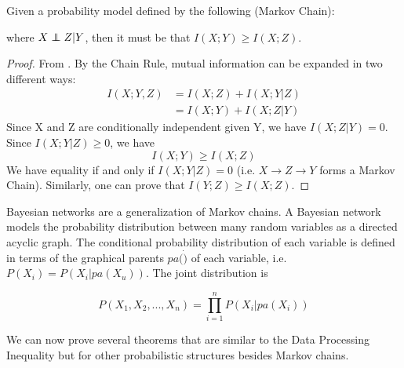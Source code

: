 \documentclass[../thesis.tex]{subfiles}
\begin{document}
\begin{thm}
  Given a probability model defined by the following (Markov Chain):
  \begin{center}
  \end{center}
  where $X \independent Z \vert Y$, then it must be that $I(X;Y) \geq I(X;Z)$.
\end{thm}
\begin{proof}
  From \cite{cover2012elements}. By the Chain Rule, mutual information
  can be expanded in two different ways:
  \begin{equation}
    \begin{split}
    I(X;Y,Z) & = I(X;Z) + I(X;Y \vert Z) \\
    & = I(X;Y) + I(X;Z \vert Y)
    \end{split}
  \end{equation}
  Since X and Z are conditionally independent given Y, we have
  $I(X;Z \vert Y) = 0$. Since $I(X;Y \vert Z) \geq 0$, we have
  \begin{equation}
    I(X;Y) \geq I(X;Z)
  \end{equation}
  We have equality if and only if $I(X;Y \vert Z) = 0$
  (i.e. $X \rightarrow Z \rightarrow Y$ forms a Markov Chain).
  Similarly, one can prove that $I(Y;Z) \geq I(X;Z)$.
\end{proof}

Bayesian networks are a generalization of Markov chains.
A Bayesian network models the probability distribution
between many random variables as a directed acyclic
graph. The conditional probability distribution of
each variable is defined in terms of the graphical
parents $pa(\dot)$ of each variable, i.e. $P(X_i) = P(X_i \vert pa(X_u))$.
The joint distribution is

\begin{equation}
  P(X_1, X_2, ..., X_n) = \prod_{i=1}^{n}P(X_i \vert pa(X_i))
\end{equation}

We can now prove several theorems that are similar to the
Data Processing Inequality but for other probabilistic
structures besides Markov chains.
\end{document}
